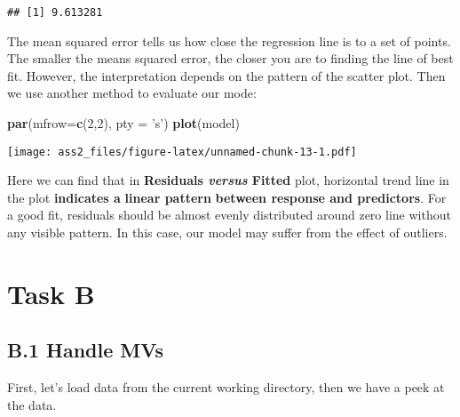 \documentclass[]{article}
\newenvironment{Shaded}{\begin{snugshade}}{\end{snugshade}}
\newcommand{\KeywordTok}[1]{\textcolor[rgb]{0.13,0.29,0.53}{\textbf{#1}}}
\newcommand{\DataTypeTok}[1]{\textcolor[rgb]{0.13,0.29,0.53}{#1}}
\newcommand{\DecValTok}[1]{\textcolor[rgb]{0.00,0.00,0.81}{#1}}
\newcommand{\StringTok}[1]{\textcolor[rgb]{0.31,0.60,0.02}{#1}}
\newcommand{\OperatorTok}[1]{\textcolor[rgb]{0.81,0.36,0.00}{\textbf{#1}}}
\newcommand{\NormalTok}[1]{#1}
\begin{document}
\begin{Shaded}
\end{Shaded}

\begin{verbatim}
## [1] 9.613281
\end{verbatim}

The mean squared error tells us how close the regression line is to a
set of points. The smaller the means squared error, the closer you are
to finding the line of best fit. However, the interpretation depends on
the pattern of the scatter plot. Then we use another method to evaluate
our mode:

\begin{Shaded}
\begin{Highlighting}[]
\KeywordTok{par}\NormalTok{(}\DataTypeTok{mfrow=}\KeywordTok{c}\NormalTok{(}\DecValTok{2}\NormalTok{,}\DecValTok{2}\NormalTok{), }\DataTypeTok{pty =} \StringTok{'s'}\NormalTok{)}
\KeywordTok{plot}\NormalTok{(model)}
\end{Highlighting}
\end{Shaded}

\texttt{[image: ass2\_files/figure-latex/unnamed-chunk-13-1.pdf]}

Here we can find that in \textbf{Residuals \emph{versus} Fitted} plot,
horizontal trend line in the plot \textbf{indicates a} \textbf{linear
pattern} \textbf{between response and predictors}. For a good fit,
residuals should be almost evenly distributed around zero line without
any visible pattern. In this case, our model may suffer from the effect
of outliers.

\section{Task B}\label{task-b}

\subsection{B.1 Handle MVs}\label{b.1-handle-mvs}

First, let's load data from the current working directory, then we have
a peek at the data.
\end{document}
